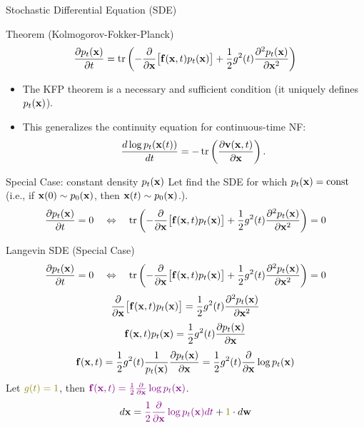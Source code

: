 \documentclass{beamer}
\begin{document}
\begin{frame}{Stochastic Differential Equation (SDE)}
	\begin{block}{Theorem (Kolmogorov-Fokker-Planck)}
		\vspace{-0.2cm}
		\[
			\frac{\partial p_t(\mathbf{x})}{\partial t} = \operatorname{tr}\left( - \frac{\partial}{\partial \mathbf{x}} \bigl[ \mathbf{f}(\mathbf{x}, t) p_t(\mathbf{x})\bigr] + \frac{1}{2} g^2(t) \frac{\partial^2 p_t(\mathbf{x})}{\partial \mathbf{x}^2}\right)
		\]
		\vspace{-0.2cm}
	\end{block}
	\begin{itemize}
		\item The KFP theorem is a necessary and sufficient condition (it uniquely defines $p_t(\mathbf{x})$).
		\item This generalizes the continuity equation for continuous-time NF:
		\[
			\frac{d \log p_t(\mathbf{x}(t))}{d t} = - \operatorname{tr} \left( \frac{\partial \mathbf{v}(\mathbf{x}, t)}{\partial \mathbf{x}} \right).
		\]
	\end{itemize}
	\eqpause
	\begin{block}{Special Case: constant density $p_t(\mathbf{x})$}
		Let find the SDE for which $p_t(\mathbf{x}) = \text{const}$ (i.e., if $\mathbf{x}(0) \sim p_0(\mathbf{x})$, then $\mathbf{x}(t) \sim p_0(\mathbf{x})$.).
		\eqpause
		\[
			\frac{\partial p_t(\mathbf{x})}{\partial t} = 0 \quad \Leftrightarrow \quad \operatorname{tr}\left( - \frac{\partial}{\partial \mathbf{x}} \bigl[ \mathbf{f}(\mathbf{x}, t) p_t(\mathbf{x})\bigr] + \frac{1}{2} g^2(t) \frac{\partial^2 p_t(\mathbf{x})}{\partial \mathbf{x}^2}\right) = 0
		\]
	\end{block}
\end{frame}
\begin{frame}{Langevin SDE (Special Case)}
	\[
		\frac{\partial p_t(\mathbf{x})}{\partial t} = 0 \quad \Leftrightarrow \quad \operatorname{tr}\left( - \frac{\partial}{\partial \mathbf{x}} \bigl[ \mathbf{f}(\mathbf{x}, t) p_t(\mathbf{x})\bigr] + \frac{1}{2} g^2(t) \frac{\partial^2 p_t(\mathbf{x})}{\partial \mathbf{x}^2}\right) = 0
	\]
	\vspace{-0.3cm}
	\eqpause
	\[
		\frac{\partial}{\partial \mathbf{x}} \bigl[ \mathbf{f}(\mathbf{x}, t) p_t(\mathbf{x})\bigr] = \frac{1}{2} g^2(t) \frac{\partial^2 p_t(\mathbf{x})}{\partial \mathbf{x}^2}
	\]
	\eqpause
	\[
		\mathbf{f}(\mathbf{x}, t) p_t(\mathbf{x}) = \frac{1}{2} g^2(t) \frac{\partial p_t(\mathbf{x})}{\partial \mathbf{x}}
	\]
	\eqpause
	\[
		\mathbf{f}(\mathbf{x}, t) = \frac{1}{2} g^2(t) \frac{1}{p_t(\mathbf{x})}\frac{\partial p_t(\mathbf{x})}{\partial \mathbf{x}} = \frac{1}{2} g^2(t) \frac{\partial}{\partial \mathbf{x}} \log p_t(\mathbf{x})
	\]
	\eqpause
	Let ${\color{olive}g(t)=1}$, then ${\color{violet}\mathbf{f}(\mathbf{x}, t) = \frac{1}{2} \frac{\partial}{\partial \mathbf{x}} \log p_t(\mathbf{x})}$.
	\[
		d \bx = {\color{violet}\frac{1}{2} \frac{\partial}{\partial \bx} \log p_t(\bx) d t} + {\color{olive}1} \cdot d \bw
	\]
\end{frame}
\end{document}
